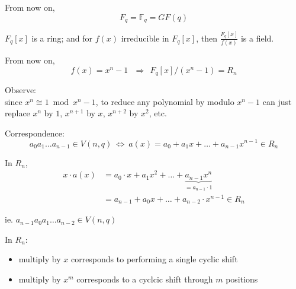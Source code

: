 \documentclass{article}
\theoremstyle{definition}
\newenvironment{remark}[1]
{\renewcommand\theinnerrem{#1}\innerrem}
{\endinnerrem}
\begin{document}
\begin{remark}{}[Notation]
  From now on,
  $$F_q = \mathbb{F}_q = GF(q)$$

  $F_q[x]$ is a ring; and for $f(x)$ irreducible in $F_q[x]$, then $\frac{F_q[x]}{f(x)}$ is a field.

  From now on,
$$f(x) = x^n -1 ~~~\Longrightarrow~~ F_q[x]/(x^n-1) = R_n$$

  \vspace{0.6cm}
  Observe:\\
  since $x^n \cong 1 \bmod{x^n -1}$, to reduce any polynomial by modulo $x^n-1$ can just replace $x^n$ by $1$, $x^{n+1}$ by $x$, $x^{n+2}$ by $x^2$, etc.

  \vspace{0.6cm}
  Correspondence:
  $$a_0 a_1 \ldots a_{n-1} \in V(n,q) ~\Longleftrightarrow~ a(x)=a_0 + a_1 x + \ldots + a_{n-1} x^{n-1} \in R_n$$

  In $R_n$,
  \begin{align*}
    x \cdot a(x) &= a_0 \cdot x + a_1 x^2 + \ldots + \underbrace{a_{n-1} x^n}_{=a_{n-1}\cdot 1}\\
                 &=a_{n-1} + a_0 x + \ldots + a_{n-2} \cdot x^{n-1} \in R_n
  \end{align*}

  ie. $a_{n-1} a_0 a_1 \ldots a_{n-2} \in V(n, q)$

  \vspace{0.6cm}
  In $R_n$:
  \begin{itemize}
    \item[$\rightarrow$] multiply by $x$ corresponds to performing a single cyclic shift
    \item[$\rightarrow$] multiply by $x^m$ corresponds to a cyclcic shift through $m$ positions
  \end{itemize}
\end{remark}
\end{document}
